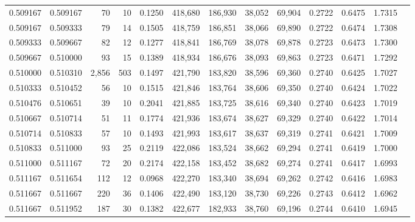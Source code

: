 \begin{tabular}{rrrrrrrrrrrrr}
0.509167 & 0.509167 &    70 &  10 &                                     0.1250 & 418,680 & 186,930 &  38,052 &  69,904 & 0.2722 & 0.6475 & 1.7315 \\
0.509167 & 0.509333 &    79 &  14 &                                     0.1505 & 418,759 & 186,851 &  38,066 &  69,890 & 0.2722 & 0.6474 & 1.7308 \\
0.509333 & 0.509667 &    82 &  12 &                                     0.1277 & 418,841 & 186,769 &  38,078 &  69,878 & 0.2723 & 0.6473 & 1.7300 \\
0.509667 & 0.510000 &    93 &  15 &                                     0.1389 & 418,934 & 186,676 &  38,093 &  69,863 & 0.2723 & 0.6471 & 1.7292 \\
0.510000 & 0.510310 & 2,856 & 503 &                                     0.1497 & 421,790 & 183,820 &  38,596 &  69,360 & 0.2740 & 0.6425 & 1.7027 \\
0.510333 & 0.510452 &    56 &  10 &                                     0.1515 & 421,846 & 183,764 &  38,606 &  69,350 & 0.2740 & 0.6424 & 1.7022 \\
0.510476 & 0.510651 &    39 &  10 &                                     0.2041 & 421,885 & 183,725 &  38,616 &  69,340 & 0.2740 & 0.6423 & 1.7019 \\
0.510667 & 0.510714 &    51 &  11 &                                     0.1774 & 421,936 & 183,674 &  38,627 &  69,329 & 0.2740 & 0.6422 & 1.7014 \\
0.510714 & 0.510833 &    57 &  10 &                                     0.1493 & 421,993 & 183,617 &  38,637 &  69,319 & 0.2741 & 0.6421 & 1.7009 \\
0.510833 & 0.511000 &    93 &  25 &                                     0.2119 & 422,086 & 183,524 &  38,662 &  69,294 & 0.2741 & 0.6419 & 1.7000 \\
0.511000 & 0.511167 &    72 &  20 &                                     0.2174 & 422,158 & 183,452 &  38,682 &  69,274 & 0.2741 & 0.6417 & 1.6993 \\
0.511167 & 0.511654 &   112 &  12 &                                     0.0968 & 422,270 & 183,340 &  38,694 &  69,262 & 0.2742 & 0.6416 & 1.6983 \\
0.511667 & 0.511667 &   220 &  36 &                                     0.1406 & 422,490 & 183,120 &  38,730 &  69,226 & 0.2743 & 0.6412 & 1.6962 \\
0.511667 & 0.511952 &   187 &  30 &                                     0.1382 & 422,677 & 182,933 &  38,760 &  69,196 & 0.2744 & 0.6410 & 1.6945 \\

\end{tabular}
